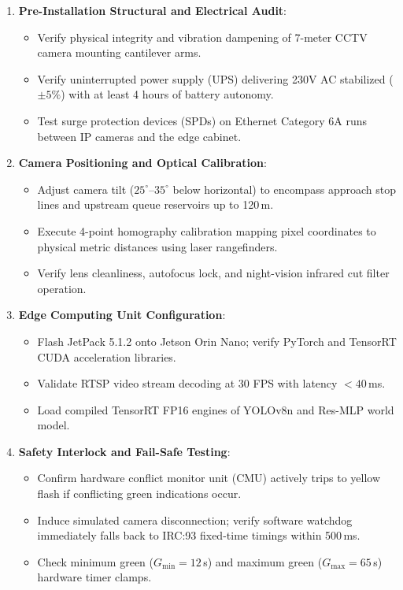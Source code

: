 \documentclass[12pt,a4paper,oneside]{report}
\begin{document}
\begin{enumerate}
    \item \textbf{Pre-Installation Structural and Electrical Audit}:
    \begin{itemize}
        \item[$\square$] Verify physical integrity and vibration dampening of 7-meter CCTV camera mounting cantilever arms.
        \item[$\square$] Verify uninterrupted power supply (UPS) delivering 230V AC stabilized ($\pm 5\%$) with at least 4 hours of battery autonomy.
        \item[$\square$] Test surge protection devices (SPDs) on Ethernet Category 6A runs between IP cameras and the edge cabinet.
    \end{itemize}

    \item \textbf{Camera Positioning and Optical Calibration}:
    \begin{itemize}
        \item[$\square$] Adjust camera tilt ($25^\circ \text{--} 35^\circ$ below horizontal) to encompass approach stop lines and upstream queue reservoirs up to 120\,m.
        \item[$\square$] Execute 4-point homography calibration mapping pixel coordinates to physical metric distances using laser rangefinders.
        \item[$\square$] Verify lens cleanliness, autofocus lock, and night-vision infrared cut filter operation.
    \end{itemize}

    \item \textbf{Edge Computing Unit Configuration}:
    \begin{itemize}
        \item[$\square$] Flash JetPack 5.1.2 onto Jetson Orin Nano; verify PyTorch and TensorRT CUDA acceleration libraries.
        \item[$\square$] Validate RTSP video stream decoding at 30 FPS with latency $< 40$\,ms.
        \item[$\square$] Load compiled TensorRT FP16 engines of YOLOv8n and Res-MLP world model.
    \end{itemize}

    \item \textbf{Safety Interlock and Fail-Safe Testing}:
    \begin{itemize}
        \item[$\square$] Confirm hardware conflict monitor unit (CMU) actively trips to yellow flash if conflicting green indications occur.
        \item[$\square$] Induce simulated camera disconnection; verify software watchdog immediately falls back to IRC:93 fixed-time timings within 500\,ms.
        \item[$\square$] Check minimum green ($G_{\min} = 12$\,s) and maximum green ($G_{\max} = 65$\,s) hardware timer clamps.
    \end{itemize}
\end{enumerate}
\end{document}
